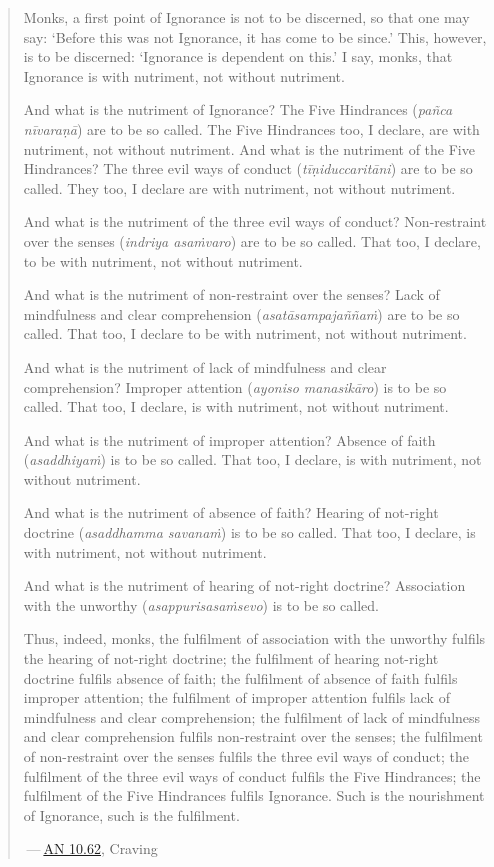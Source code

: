 \begin{quote}
Monks, a first point of Ignorance is not to be discerned, so that one may say: `Before this was not Ignorance, it has come to be since.' This, however, is to be discerned: `Ignorance is dependent on this.' I say, monks, that Ignorance is with nutriment, not without nutriment.

And what is the nutriment of Ignorance? The Five Hindrances (\emph{pañca nīvaraṇā}) are to be so called. The Five Hindrances too, I declare, are with nutriment, not without nutriment. And what is the nutriment of the Five Hindrances? The three evil ways of conduct (\emph{tīṇiduccaritāni}) are to be so called. They too, I declare are with nutriment, not without nutriment.

And what is the nutriment of the three evil ways of conduct? Non-restraint over the senses (\emph{indriya asaṁvaro}) are to be so called. That too, I declare, to be with nutriment, not without nutriment.

And what is the nutriment of non-restraint over the senses? Lack of mindfulness and clear comprehension (\emph{asatāsampajaññaṁ}) are to be so called. That too, I declare to be with nutriment, not without nutriment.

And what is the nutriment of lack of mindfulness and clear comprehension? Improper attention (\emph{ayoniso manasikāro}) is to be so called. That too, I declare, is with nutriment, not without nutriment.

And what is the nutriment of improper attention? Absence of faith (\emph{asaddhiyaṁ}) is to be so called. That too, I declare, is with nutriment, not without nutriment.

And what is the nutriment of absence of faith? Hearing of not-right doctrine (\emph{asaddhamma savanaṁ}) is to be so called. That too, I declare, is with nutriment, not without nutriment.

And what is the nutriment of hearing of not-right doctrine? Association with the unworthy (\emph{asappurisasaṁsevo}) is to be so called.

Thus, indeed, monks, the fulfilment of association with the unworthy fulfils the hearing of not-right doctrine; the fulfilment of hearing not-right doctrine fulfils absence of faith; the fulfilment of absence of faith fulfils improper attention; the fulfilment of improper attention fulfils lack of mindfulness and clear comprehension; the fulfilment of lack of mindfulness and clear comprehension fulfils non-restraint over the senses; the fulfilment of non-restraint over the senses fulfils the three evil ways of conduct; the fulfilment of the three evil ways of conduct fulfils the Five Hindrances; the fulfilment of the Five Hindrances fulfils Ignorance. Such is the nourishment of Ignorance, such is the fulfilment.

 --- \href{https://suttacentral.net/an10.62/en/bodhi}{AN 10.62}, Craving
\end{quote}

